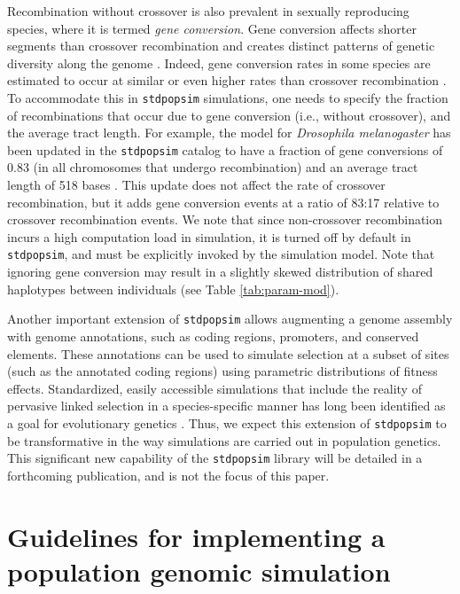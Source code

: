 \documentclass[hidelinks]{article}
\makeatletter
\newcommand{\stdpopsim}{\texttt{stdpopsim}\xspace}
\newcommand{\labelname}[1]{\def\@currentlabelname{#1}}
\makeatother
\begin{document}
Recombination without crossover is also prevalent in sexually reproducing species,
where it is termed \emph{gene conversion}.
Gene conversion affects shorter segments than crossover recombination and creates distinct patterns of genetic diversity along the genome \citep{Korunes2017}.
Indeed, gene conversion rates in some species are estimated to occur at similar or even higher rates than crossover recombination \citep{Gay2007,Comeron2012,Wijnker2013}.
To accommodate this in \stdpopsim simulations,
one needs to specify the fraction of recombinations that occur due to gene conversion (i.e., without crossover), and the average tract length.
For example, the model for \emph{Drosophila melanogaster} has been updated in the \stdpopsim catalog to have a fraction of gene conversions of 0.83 (in all chromosomes that undergo recombination) and an average tract length of 518 bases \citep{Comeron2012}.
This update does not affect the rate of crossover recombination, but it adds gene conversion events at a ratio of 83:17 relative to crossover recombination events.
We note that since non-crossover recombination incurs a high computation load in simulation,
it is turned off by default in \stdpopsim, 
and must be explicitly invoked by the simulation model.
%
Note that ignoring gene conversion may result in a slightly skewed distribution of shared haplotypes between individuals (see Table \ref{tab:param-mod}).

Another important extension of \stdpopsim allows augmenting a genome assembly with genome annotations, such as coding regions, promoters, and conserved elements.
These annotations can be used to simulate selection at a subset of sites (such as the annotated coding regions)
using parametric distributions of fitness effects.
Standardized, easily accessible simulations
that include the reality of pervasive linked selection in a species-specific
manner has long been identified as a goal for evolutionary genetics
\cite[e.g.,][]{McVicker2009,comeron2014background}.
Thus, we expect this extension of \stdpopsim to be transformative in the way simulations are carried out in population genetics.
This significant new capability of the \stdpopsim library will be detailed in a forthcoming publication,
and is not the focus of this paper.

\section*{Guidelines for implementing a population genomic simulation}
    \labelname{Guidelines}
    \label{sec:sim-guidelines}
\end{document}
